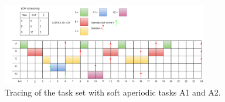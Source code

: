         \begin{figure}[H]
            \centering
            \includegraphics[width=0.8\textwidth]{images/Ass1Q8c.png}
            \caption{Tracing of the task set with soft aperiodic tasks A1 and A2.}
            \label{fig:Q8Ctrace}
        \end{figure}